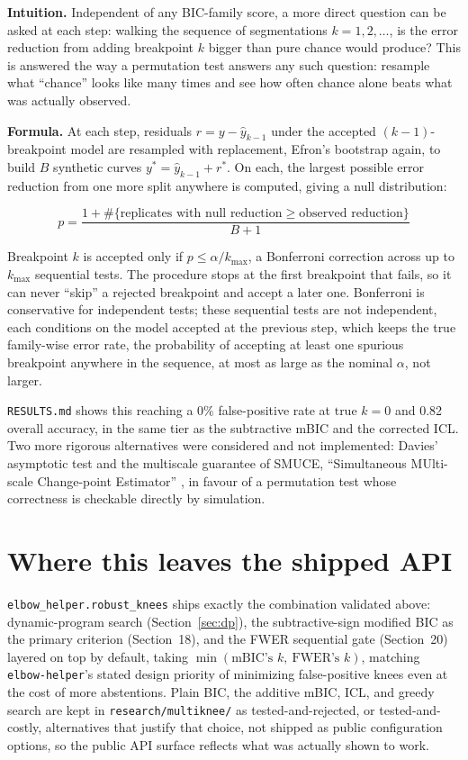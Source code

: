 \documentclass[11pt]{article}
\newcommand{\code}[1]{\texttt{#1}}
\begin{document}
\textbf{Intuition.} Independent of any BIC-family score, a more direct
question can be asked at each step: walking the sequence of segmentations
$k = 1, 2, \dots$, is the error reduction from adding breakpoint $k$ bigger
than pure chance would produce? This is answered the way a permutation
test answers any such question: resample what ``chance'' looks like many
times and see how often chance alone beats what was actually observed.

\textbf{Formula.} At each step, residuals $r = y - \hat y_{k-1}$ under the
accepted $(k-1)$-breakpoint model are resampled with replacement, Efron's
bootstrap again, to build $B$ synthetic curves $y^\ast = \hat y_{k-1} +
r^\ast$. On each, the largest possible error reduction from one more split
anywhere is computed, giving a null distribution:

\begin{equation}
p = \frac{1 + \#\{\text{replicates with null reduction} \ge \text{observed reduction}\}}{B + 1}
\end{equation}

Breakpoint $k$ is accepted only if $p \le \alpha / k_{\max}$, a Bonferroni
correction across up to $k_{\max}$ sequential tests. The procedure stops at
the first breakpoint that fails, so it can never ``skip'' a rejected
breakpoint and accept a later one. Bonferroni is conservative for
independent tests; these sequential tests are not independent, each
conditions on the model accepted at the previous step, which keeps the true
family-wise error rate, the probability of accepting at least one spurious
breakpoint anywhere in the sequence, at most as large as the nominal
$\alpha$, not larger.

\code{RESULTS.md} shows this reaching a 0\% false-positive rate at
$\text{true } k = 0$ and 0.82 overall accuracy, in the same tier as the
subtractive mBIC and the corrected ICL. Two more rigorous alternatives were
considered and not implemented: Davies' asymptotic test
\citeyearpar{davies1977} and the multiscale guarantee of SMUCE,
``Simultaneous MUlti-scale Change-point Estimator'' \citep{frick2014}, in
favour of a permutation test whose correctness is checkable directly by
simulation.

\section{Where this leaves the shipped API}

\code{elbow\_helper.robust\_knees} ships exactly the combination validated
above: dynamic-program search (Section~\ref{sec:dp}), the subtractive-sign
modified BIC as the primary criterion (Section~18), and the FWER
sequential gate (Section~20) layered on top by default, taking
$\min(\text{mBIC's } k,\ \text{FWER's } k)$, matching \code{elbow-helper}'s
stated design priority of minimizing false-positive knees even at the cost
of more abstentions. Plain BIC, the additive mBIC, ICL, and greedy search
are kept in \code{research/multiknee/} as tested-and-rejected, or
tested-and-costly, alternatives that justify that choice, not shipped as
public configuration options, so the public API surface reflects what was
actually shown to work.
\end{document}
